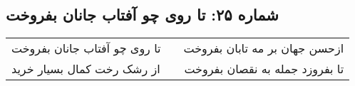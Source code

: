 \begin{center}
\section*{شماره ۲۵: تا روی چو آفتاب جانان بفروخت}
\label{sec:025}
\begin{longtable}{l p{0.5cm} r}
تا روی چو آفتاب جانان بفروخت
&&
ازحسن جهان بر مه تابان بفروخت
\\
از رشک رخت کمال بسیار خرید
&&
تا بفروزد جمله به نقصان بفروخت
\\
\end{longtable}
\end{center}
